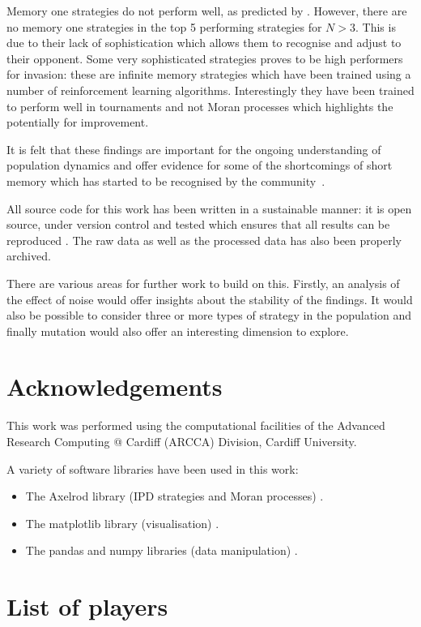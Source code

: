 \documentclass{article}
\begin{document}
Memory one strategies do not perform well, as predicted by \cite{Press2012}.
However, there are no memory one strategies in the top 5 performing strategies
for \(N>3\). This is due to their lack of sophistication which allows them to
recognise and adjust to their opponent. Some very sophisticated strategies
proves to be high performers for invasion: these are infinite memory strategies
which have been trained using a number of reinforcement learning algorithms.
Interestingly they have been trained to perform well in tournaments and not
Moran processes which highlights the potentially for improvement.

It is felt that these findings are important for the ongoing understanding of
population dynamics and offer evidence for some of the shortcomings of short
memory which has started to be recognised by the community~\cite{Hilbe2017}.


All source code for this work has been written in a sustainable manner: it is
open source, under version control and tested which ensures that all results can
be reproduced \cite{Prlic2012, Sandve2013, Wilson2014}. The raw data as well as
the processed data has also been properly archived.

There are various areas for further work to build on this. Firstly, an analysis
of the effect of noise would offer insights about the stability of the findings.
It would also be possible to consider three or more types of strategy in the
population and finally mutation would also offer an interesting dimension to
explore.

\section*{Acknowledgements}

This work was performed using the computational facilities of the Advanced
Research Computing @ Cardiff (ARCCA) Division, Cardiff University.

A variety of software libraries have been used in this work:

\begin{itemize}
    \item The Axelrod library (IPD strategies and Moran processes)
        \cite{axelrodproject}.
    \item The matplotlib library (visualisation) \cite{hunter2007matplotlib}.
    \item The pandas and numpy libraries (data manipulation)
        \cite{mckinney2010data, walt2011numpy}.
\end{itemize}

\printbibliography

\appendix

\section{List of players}\label{app:list_of_players}

\begin{multicols}{3}
	\begin{enumerate}
		
	\end{enumerate}
\end{multicols}
\end{document}
